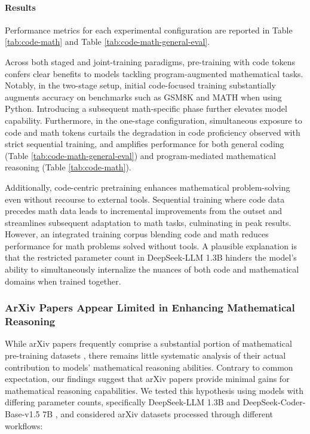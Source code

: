 \begin{itemize}[topsep=0pt]
\paragraph{Results}
Performance metrics for each experimental configuration are reported in Table \ref{tab:code-math} and Table \ref{tab:code-math-general-eval}.

Across both staged and joint-training paradigms, pre-training with code tokens confers clear benefits to models tackling program-augmented mathematical tasks. Notably, in the two-stage setup, initial code-focused training substantially augments accuracy on benchmarks such as GSM8K and MATH when using Python. Introducing a subsequent math-specific phase further elevates model capability. Furthermore, in the one-stage configuration, simultaneous exposure to code and math tokens curtails the degradation in code proficiency observed with strict sequential training, and amplifies performance for both general coding (Table \ref{tab:code-math-general-eval}) and program-mediated mathematical reasoning (Table \ref{tab:code-math}).

Additionally, code-centric pretraining enhances mathematical problem-solving even without recourse to external tools. Sequential training where code data precedes math data leads to incremental improvements from the outset and streamlines subsequent adaptation to math tasks, culminating in peak results. However, an integrated training corpus blending code and math reduces performance for math problems solved without tools. A plausible explanation is that the restricted parameter count in DeepSeek-LLM 1.3B hinders the model’s ability to simultaneously internalize the nuances of both code and mathematical domains when trained together.

\subsubsection{ArXiv Papers Appear Limited in Enhancing Mathematical Reasoning}

While arXiv papers frequently comprise a substantial portion of mathematical pre-training datasets \citep{minerva,gpt-f,llemma,mathpile}, there remains little systematic analysis of their actual contribution to models’ mathematical reasoning abilities. Contrary to common expectation, our findings suggest that arXiv papers provide minimal gains for mathematical reasoning capabilities. We tested this hypothesis using models with differing parameter counts, specifically DeepSeek-LLM 1.3B and DeepSeek-Coder-Base-v1.5 7B \citep{deepseek-coder}, and considered arXiv datasets processed through different workflows:


\end{itemize}
